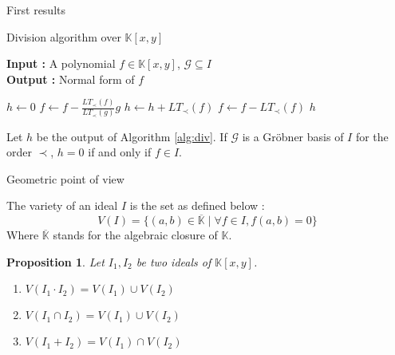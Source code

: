 \documentclass{beamer}
\newtheorem{proposition}{Proposition}[section]
\begin{document}
\begin{frame}[shrink=20]{First results}
    \begin{algorithm}[H]
        \caption{Division algorithm over $\mathbb{K}[x, y]$} \label{alg:div}
        \textbf{Input : }A polynomial $f \in \mathbb{K}[x, y]$, $\mathscr{G} \subseteq I$ \\
        \textbf{Output : }Normal form of $f$
        \begin{algorithmic}
            \State $h \gets 0$
                    \State $f \gets f- \displaystyle \frac{LT_{\prec}(f)}{LT_{\prec}(g)}g$
                \Else
                    \State $h \gets h + LT_{\prec}(f)$
                    \State $f \gets f - LT_{\prec}(f)$
                \EndIf
            \EndWhile
            \State \Return $h$
        \end{algorithmic}
        \end{algorithm}
    \begin{theorem} \label{th:ideal-membership-test}
        Let $h$ be the output of Algorithm \ref{alg:div}. If $\mathscr{G}$ is a Gröbner basis of $I$ for the order $\prec$, $h = 0$ if and only if $f \in I$.
    \end{theorem}
\end{frame}

\begin{frame}{Geometric point of view}
    \begin{definition} 
        The variety of an ideal $I$ is the set as defined below :
        \begin{displaymath}
            V(I) = \{ (a, b) \in \overline{\mathbb{K}} \mid \forall f \in I, f(a, b) = 0 \}
        \end{displaymath}
        Where $\overline{\mathbb{K}}$ stands for the algebraic closure of $\mathbb{K}$.
    \end{definition}
    \begin{proposition}
        Let $I_{1}, I_{2}$ be two ideals of $\mathbb{K}[x, y]$.
        \begin{enumerate}
            \item[(i)] $V(I_{1} \cdot I_{2}) = V(I_{1}) \cup V(I_{2})$
            \item[(ii)] $V(I_{1} \cap I_{2}) = V(I_{1}) \cup V(I_{2})$
            \item[(iii)] $V(I_{1} + I_{2}) = V(I_{1}) \cap V(I_{2})$
        \end{enumerate}
    \end{proposition}
\end{frame}
\end{document}
